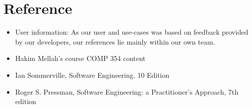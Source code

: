 \documentclass[11pt]{article}
\newcounter{use case ID}
\begin{document}
\section{Reference}

\begin{itemize}
    \item User information: As our user and use-cases was based on feedback provided by our developers, our references lie mainly within our own team.
    \item Hakim Mellah's course COMP 354 content
    \item Ian Sommerville, Software Engineering. 10 Edition
    \item Roger S. Pressman, Software Engineering: a Practitioner's Approach, 7th edition
\end{itemize}
\end{document}
